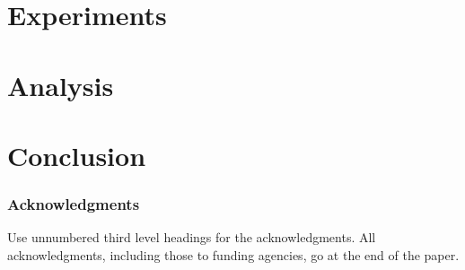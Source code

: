 \documentclass{article} %
\begin{document}
\section{Experiments}


\section{Analysis}


\section{Conclusion}



\subsubsection*{Acknowledgments}

Use unnumbered third level headings for the acknowledgments. All
acknowledgments, including those to funding agencies, go at the end of the paper.


\end{document}
